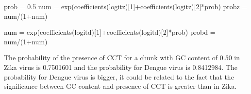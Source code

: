 \documentclass[
]{article}
\newenvironment{Shaded}{\begin{snugshade}}{\end{snugshade}}
\newcommand{\DecValTok}[1]{\textcolor[rgb]{0.00,0.00,0.81}{#1}}
\newcommand{\FloatTok}[1]{\textcolor[rgb]{0.00,0.00,0.81}{#1}}
\newcommand{\FunctionTok}[1]{\textcolor[rgb]{0.00,0.00,0.00}{#1}}
\newcommand{\NormalTok}[1]{#1}
\newcommand{\OtherTok}[1]{\textcolor[rgb]{0.56,0.35,0.01}{#1}}
\newcommand{\SpecialCharTok}[1]{\textcolor[rgb]{0.00,0.00,0.00}{#1}}
\begin{document}
\begin{Shaded}
\begin{Highlighting}[]
\NormalTok{prob }\OtherTok{=} \FloatTok{0.5}
\NormalTok{num }\OtherTok{=} \FunctionTok{exp}\NormalTok{(}\FunctionTok{coefficients}\NormalTok{(logitz)[}\DecValTok{1}\NormalTok{]}\SpecialCharTok{+}\FunctionTok{coefficients}\NormalTok{(logitz)[}\DecValTok{2}\NormalTok{]}\SpecialCharTok{*}\NormalTok{prob)}
\NormalTok{probz }\OtherTok{=}\NormalTok{ num}\SpecialCharTok{/}\NormalTok{(}\DecValTok{1}\SpecialCharTok{+}\NormalTok{num)}
\end{Highlighting}
\end{Shaded}

\begin{Shaded}
\begin{Highlighting}[]
\NormalTok{num }\OtherTok{=} \FunctionTok{exp}\NormalTok{(}\FunctionTok{coefficients}\NormalTok{(logitd)[}\DecValTok{1}\NormalTok{]}\SpecialCharTok{+}\FunctionTok{coefficients}\NormalTok{(logitd)[}\DecValTok{2}\NormalTok{]}\SpecialCharTok{*}\NormalTok{prob)}
\NormalTok{probd }\OtherTok{=}\NormalTok{ num}\SpecialCharTok{/}\NormalTok{(}\DecValTok{1}\SpecialCharTok{+}\NormalTok{num)}
\end{Highlighting}
\end{Shaded}

The probability of the presence of CCT for a chunk with GC content of
0.50 in Zika virus is 0.7501601 and the probability for Dengue virus is
0.8412984. The probability for Dengue virus is bigger, it could be
related to the fact that the significance between GC content and
presence of CCT is greater than in Zika.
\end{document}
